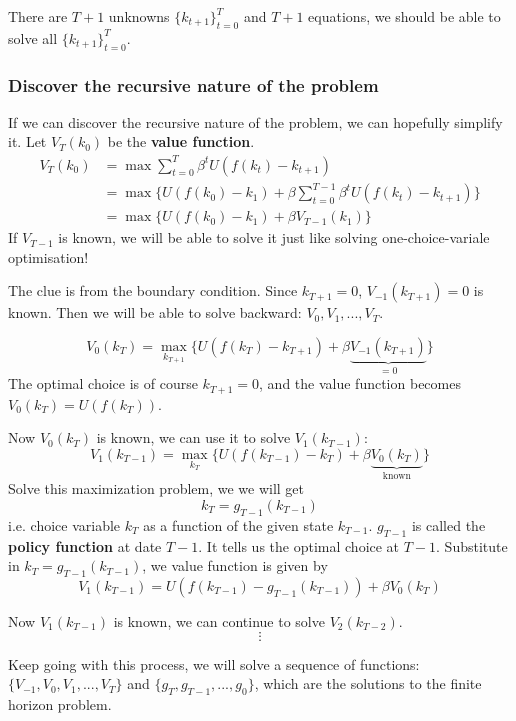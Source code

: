 \documentclass[10pt,a4]{article}
\begin{document}
There are $T+1$ unknowns $\{k_{t+1}\}_{t=0}^{T}$ and $T+1$ equations, we should be able to solve all $\{k_{t+1}\}_{t=0}^{T}$.

\subsubsection{Discover the recursive nature of the
problem}

{\label{336406}}

If we can discover the recursive nature of the problem, we can hopefully simplify it. Let $V_T(k_0)$ be the \textbf{value function}.
\[
    \begin{aligned}
        V_T(k_0) &= \max \sum_{t=0}^T \beta^t U(f(k_t)-k_{t+1}) \\
                 &= \max \{U(f(k_0)-k_1) + \beta \sum_{t=0}^{T-1} \beta^t U(f(k_t)-k_{t+1})\}  \\ 
                 &= \max \{U(f(k_0)-k_1) + \beta V_{T-1}(k_1)\}
    \end{aligned}
\]
If $V_{T-1}$ is known, we will be able to solve it just like solving one-choice-variale optimisation!



The clue is from the boundary condition. Since $k_{T+1} = 0$, $V_{-1}(k_{T+1})=0$ is known. Then we will be able to solve backward: $V_0, V_1,..., V_T$.

$$ V_0(k_T) = \max_{k_{T+1}} \{U(f(k_T)-k_{T+1}) + \beta \underbrace{V_{-1}(k_{T+1})}_{=0}\}$$
The optimal choice is of course $ k_{T+1} = 0 $, and the value function becomes $ V_0(k_T) = U(f(k_T)) $.

Now $V_0(k_T)$ is known, we can use it to solve $V_1(k_{T-1})$:
$$ V_1(k_{T-1}) = \max_{k_{T}} \{U(f(k_{T-1})-k_{T}) + \beta \underbrace{V_{0}(k_{T})}_{\textrm{known}}\}$$
Solve this maximization problem, we we will get 
$$ k_{T} = g_{T-1}(k_{T-1}) $$
i.e. choice variable $k_T$ as a function of the given state $k_{T-1}$. $g_{T-1}$ is called the \textbf{policy function} at date $T-1$. It tells us the optimal choice at $T-1$.
Substitute in $ k_{T} = g_{T-1}(k_{T-1}) $, we value function is given by
$$V_1(k_{T-1}) = U(f(k_{T-1})-g_{T-1}(k_{T-1})) + \beta V_0(k_{T}) $$

Now $V_1(k_{T-1})$ is known, we can continue to solve $V_2(k_{T-2})$.
$$\vdots$$

Keep going with this process, we will solve a sequence of functions: $\{V_{-1}, V_0, V_1,..., V_T\}$ and $\{g_T, g_{T-1}, ... , g_0\}$, which are the solutions to the finite horizon problem.
\end{document}

